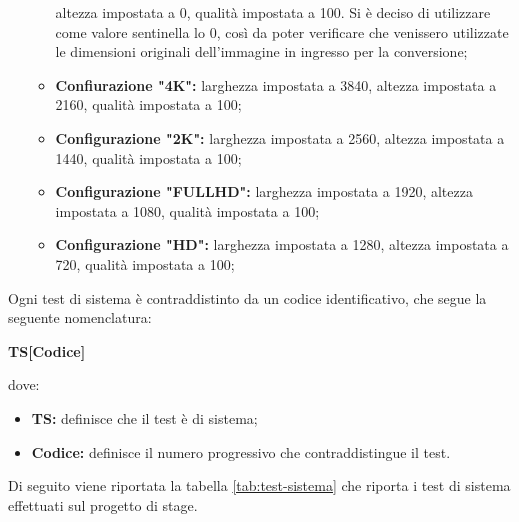 \begin{itemize}
\begin{itemize}
                    altezza impostata a 0, qualità impostata a 100. Si è deciso di
                    utilizzare come valore sentinella lo 0, così da poter verificare che
                    venissero utilizzate le dimensioni originali dell'immagine in ingresso
                    per la conversione;
              \item \textbf{Confiurazione "4K":} larghezza impostata a 3840, altezza
                    impostata a 2160, qualità impostata a 100;
              \item \textbf{Configurazione "2K":} larghezza impostata a 2560, altezza
                    impostata a 1440, qualità impostata a 100;
              \item \textbf{Configurazione "FULLHD":} larghezza impostata a 1920,
                    altezza impostata a 1080, qualità impostata a 100;
              \item \textbf{Configurazione "HD":} larghezza impostata a 1280, altezza
                    impostata a 720, qualità impostata a 100;
          \end{itemize}
\end{itemize}

Ogni test di sistema è contraddistinto da un codice identificativo, che segue la
seguente nomenclatura: \\
\begin{center}
    \textbf{TS[Codice]}
\end{center}
dove:
\begin{itemize}
    \item \textbf{TS:} definisce che il test è di sistema;
    \item \textbf{Codice:} definisce il numero progressivo che contraddistingue il test.
\end{itemize}

Di seguito viene riportata la tabella \ref{tab:test-sistema} che riporta i test
di sistema effettuati sul progetto di stage.


